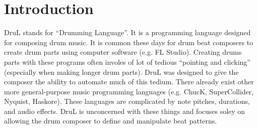 
\section{Introduction}

DruL stands for ``Drumming Language''.  It is a programming language designed for composing drum music.  It is common these days for drum beat composers to create drum parts using computer software (e.g. FL Studio).  Creating drums parts with these programs often involes of lot of tedious ``pointing and clicking'' (especially when making longer drum parts).  DruL was designed to give the composer the ability to automate much of this tedium.  There already exist other more general-purpose music programming languages (e.g. ChucK, SuperCollider, Nyquist, Haskore).  These languages are complicated by note pitches, durations, and audio effects.  DruL is unconcerned with these things and focuses soley on allowing the drum composer to define and manipulate beat patterns.
